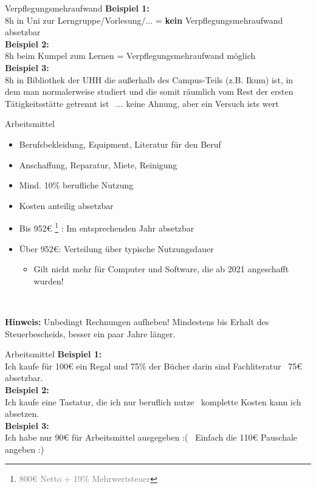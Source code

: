 \documentclass{beamer}
\newcommand{\n}{\hfill\\\vspace{0.25cm}}
\let\oldfootnote\footnote
\renewcommand{\footnote}[1]
{%
	\oldfootnote
	{
		\tiny
		\textcolor{gray}{#1}
	}%
}
\begin{document}
			\begin{frame}{Verpflegungsmehraufwand}
				\textbf{Beispiel 1:}\\
				8h in Uni zur Lerngruppe/Vorlesung/... = \textbf{kein} Verpflegungsmehraufwand absetzbar\n
				\textbf{Beispiel 2:}\\
				8h beim Kumpel zum Lernen = Verpflegungsmehraufwand möglich\n
				\textbf{Beispiel 3:}\\
				8h in Bibliothek der UHH die außerhalb des Campus-Teils (z.B. Ikum) ist, in dem man normalerweise studiert und die somit räumlich vom Rest der ersten Tätigkeitsstätte getrennt ist \textrightarrow\ ... keine Ahnung, aber ein Versuch ists wert
			\end{frame}
		
			\begin{frame}{Arbeitsmittel}
				\begin{itemize}
					\item Berufsbekleidung, Equipment, Literatur für den Beruf
					\item Anschaffung, Reparatur, Miete, Reinigung
					\item Mind. 10\% berufliche Nutzung
					\item Kosten anteilig absetzbar
					\item Bis 952€\footnote{800€ Netto + 19\% Mehrwertsteuer}: Im entsprechenden Jahr absetzbar
					\item Über 952€: Verteilung über typische Nutzungsdauer
					\begin{itemize}
						\item Gilt nicht mehr für Computer und Software, die ab 2021 angeschafft wurden!
					\end{itemize}
				\end{itemize}\n
			
				\textbf{Hinweis:} Unbedingt Rechnungen aufheben! Mindestens bis Erhalt des Steuerbescheids, besser ein paar Jahre länger.
			\end{frame}
		
			\begin{frame}{Arbeitsmittel}
				\textbf{Beispiel 1:}\\
				Ich kaufe für 100€ ein Regal und 75\% der Bücher darin sind Fachliteratur \textrightarrow\ 75€ absetzbar.\n
				\textbf{Beispiel 2:}\\
				Ich kaufe eine Tastatur, die ich nur beruflich nutze \textrightarrow\ komplette Kosten kann ich absetzen.\n
				\textbf{Beispiel 3:}\\
				Ich habe nur 90€ für Arbeitsmittel ausgegeben :( \textrightarrow\ Einfach die 110€ Pauschale angeben :)
			\end{frame}
		
\end{document}
